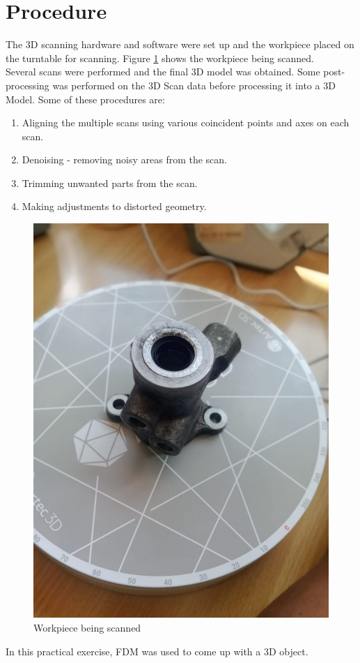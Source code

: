 \section{Procedure}
The 3D scanning hardware and software were set up and the workpiece placed on the turntable for scanning. Figure \ref{fig:scanning} shows the workpiece being scanned.\\
Several scans were performed and the final 3D model was obtained. Some post-processing was performed on the 3D Scan data before processing it into a 3D Model. Some of these procedures are:
\begin{enumerate}
	\item Aligning the multiple scans using various coincident points and axes on each scan.
	\item Denoising - removing noisy areas from the scan.
	\item Trimming unwanted parts from the scan.
	\item Making adjustments to distorted geometry.
\end{enumerate} 
\begin{center}
 	\begin{figure}[h!]
 	\centering
 	\includegraphics[width=0.4\linewidth]{Figures/Figure 2}
 	\caption[Scanning]{Workpiece being scanned}
 	\label{fig:scanning}
 	\end{figure}
 \end{center}
In this practical exercise, FDM was used to come up with a 3D object.
